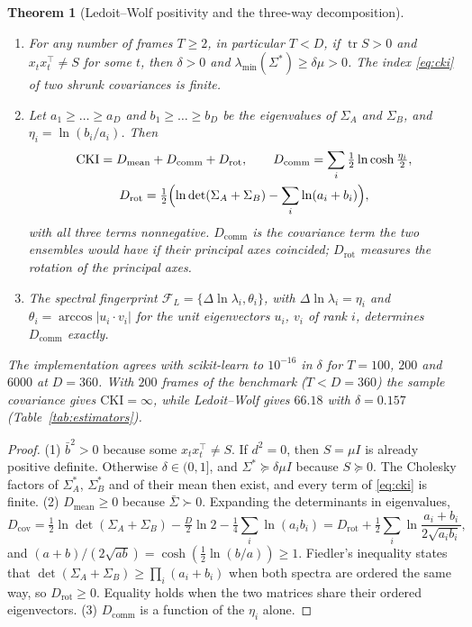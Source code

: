 \documentclass[11pt,reqno]{amsart}
\theoremstyle{plain}
\newtheorem{theorem}{Theorem}[section]
\theoremstyle{definition}
\theoremstyle{remark}
\numberwithin{equation}{section}
\begin{document}
\begin{theorem}[Ledoit--Wolf positivity and the three-way decomposition]\label{thm:lw}
\begin{enumerate}[label=\textup{(\arabic*)},leftmargin=*]
\item For any number of frames $T\ge2$, in particular $T<D$, if $\operatorname{tr}S>0$ and $x_tx_t^{\top}\ne S$ for some $t$, then $\delta>0$ and $\lambda_{\min}(\Sigma^*)\ge\delta\mu>0$. The index \eqref{eq:cki} of two shrunk covariances is finite.
\item Let $a_1\ge\dots\ge a_D$ and $b_1\ge\dots\ge b_D$ be the eigenvalues of $\Sigma_A$ and $\Sigma_B$, and $\eta_i=\ln(b_i/a_i)$. Then
\begin{equation}\label{eq:threeway}
\begin{gathered}
\mathrm{CKI}=D_{\mathrm{mean}}+D_{\mathrm{comm}}+D_{\mathrm{rot}},\qquad D_{\mathrm{comm}}=\sum_i\tfrac12\ln\cosh\tfrac{\eta_i}2,\\
D_{\mathrm{rot}}=\tfrac12\Bigl(\ln\det(\Sigma_A+\Sigma_B)-\sum_i\ln(a_i+b_i)\Bigr),
\end{gathered}
\end{equation}
with all three terms nonnegative. $D_{\mathrm{comm}}$ is the covariance term the two ensembles would have if their principal axes coincided; $D_{\mathrm{rot}}$ measures the rotation of the principal axes.
\item The spectral fingerprint $\mathcal F_L=\{\Delta\ln\lambda_i,\theta_i\}$, with $\Delta\ln\lambda_i=\eta_i$ and $\theta_i=\arccos|u_i\cdot v_i|$ for the unit eigenvectors $u_i$, $v_i$ of rank $i$, determines $D_{\mathrm{comm}}$ exactly.
\end{enumerate}
The implementation agrees with scikit-learn \cite{Pedregosa2011} to $10^{-16}$ in $\delta$ for $T=100$, $200$ and $6000$ at $D=360$. With $200$ frames of the benchmark ($T<D=360$) the sample covariance gives $\mathrm{CKI}=\infty$, while Ledoit--Wolf gives $66.18$ with $\delta=0.157$ (Table~\ref{tab:estimators}).
\end{theorem}

\begin{proof}
(1) $\bar b^2>0$ because some $x_tx_t^{\top}\ne S$. If $d^2=0$, then $S=\mu I$ is already positive definite. Otherwise $\delta\in(0,1]$, and $\Sigma^*\succeq\delta\mu I$ because $S\succeq0$. The Cholesky factors of $\Sigma^*_A$, $\Sigma^*_B$ and of their mean then exist, and every term of \eqref{eq:cki} is finite.
(2) $D_{\mathrm{mean}}\ge0$ because $\bar\Sigma\succ0$. Expanding the determinants in eigenvalues,
\[
D_{\mathrm{cov}}=\tfrac12\ln\det(\Sigma_A+\Sigma_B)-\tfrac D2\ln2-\tfrac14\sum_i\ln(a_ib_i)=D_{\mathrm{rot}}+\tfrac12\sum_i\ln\frac{a_i+b_i}{2\sqrt{a_ib_i}},
\]
and $(a+b)/(2\sqrt{ab})=\cosh(\tfrac12\ln(b/a))\ge1$. Fiedler's inequality \cite{Fiedler1971} states that $\det(\Sigma_A+\Sigma_B)\ge\prod_i(a_i+b_i)$ when both spectra are ordered the same way, so $D_{\mathrm{rot}}\ge0$. Equality holds when the two matrices share their ordered eigenvectors.
(3) $D_{\mathrm{comm}}$ is a function of the $\eta_i$ alone.
\end{proof}
\end{document}
